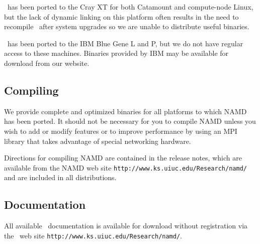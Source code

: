 \NAMD\ has been ported to the Cray XT for both Catamount
and compute-node Linux, but the lack of dynamic linking on this platform
often results in the need to recompile \NAMD\ after system upgrades so we are
unable to distribute useful binaries.

\NAMD\ has been ported to the IBM Blue Gene L and P, but we do
not have regular access to these machines.  Binaries provided by
IBM may be available for download from our website.

\subsection{Compiling \NAMD}

We provide complete and optimized binaries for all
platforms to which NAMD has been ported.
It should not be necessary for you to compile
NAMD unless you wish to add or modify features
or to improve performance by using an MPI library
that takes advantage of special networking hardware.

Directions for compiling NAMD are contained in the release notes,
which are available from the NAMD web site
{\tt http://www.ks.uiuc.edu/Research/namd/}
and are included in all distributions.

\subsection{Documentation}

All available \NAMD\ documentation is available for download without
registration via the \NAMD\ web site
{\tt http://www.ks.uiuc.edu/Research/namd/}.

